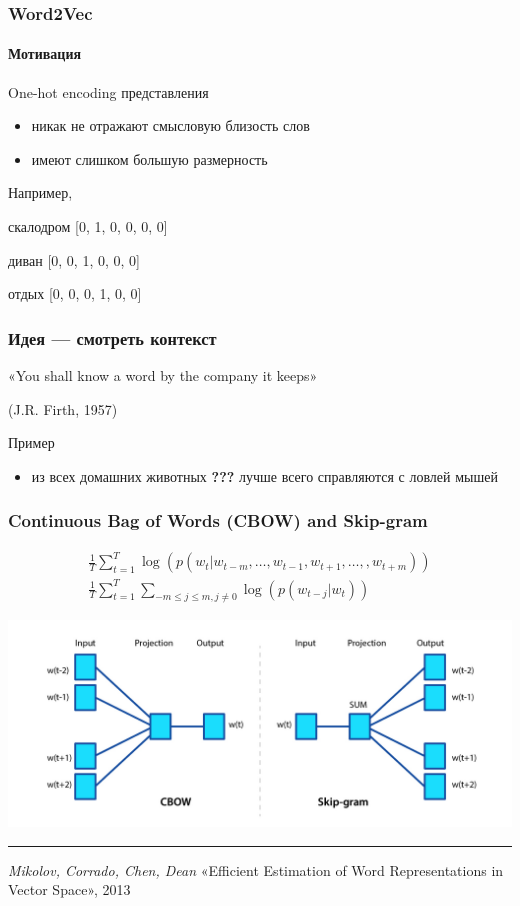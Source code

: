 \documentclass[fullscreen=true, bookmarks=true, hyperref={pdfencoding=unicode}]{beamer}
\begin{document}
\begin{frame}
  \frametitle{Word2Vec}
  \framesubtitle{Мотивация}

  One-hot encoding представления
  \begin{itemize}
    \item никак не отражают смысловую близость слов
    \item имеют слишком большую размерность
  \end{itemize}

  \vspace{1.5cm}
  Например,

  скалодром [0, 1, 0, 0, 0, 0]

  диван [0, 0, 1, 0, 0, 0]

  отдых [0, 0, 0, 1, 0, 0]
\end{frame}


\begin{frame}
  \frametitle{Идея — смотреть контекст}

  «You shall know a word by the company it keeps»

  (J.R. Firth, 1957)

  \vspace{1cm}
  Пример
  \begin{itemize}
    \item из всех домашних животных {\bf ???} лучше всего справляются с ловлей мышей
  \end{itemize}

\end{frame}


\begin{frame}
  \frametitle{Continuous Bag of Words (CBOW) and Skip-gram}
  \vspace{-.25cm}
  {\small
  \begin{align*}
    \frac{1}{T}\sum\limits_{t=1}^T \log(p(w_{t}|w_{t-m}, \dots, w_{t-1}, w_{t+1}, \dots, , w_{t+m})) \\
   \frac{1}{T}\sum\limits_{t=1}^T \sum\limits_{-m \leq j \leq m, j \neq 0} \log(p(w_{t-j}|w_{t}))
  \end{align*}
  }

  \begin{center}
    \includegraphics[keepaspectratio,
                     width=.8\paperwidth]{CBOW and skip-gram.jpg}
  \end{center}

  \noindent\rule{8cm}{0.4pt}

  {\footnotesize
  {\it Mikolov, Corrado, Chen, Dean} «Efficient Estimation of Word Representations in Vector Space», 2013}

\end{frame}
\end{document}
